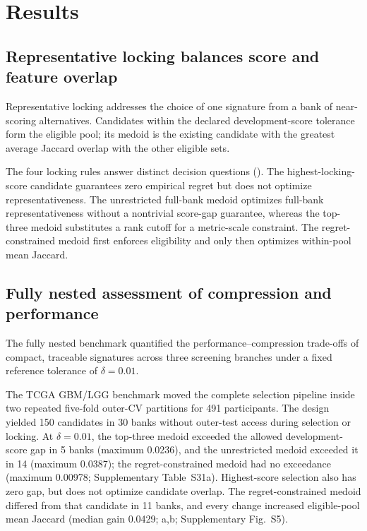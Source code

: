 

\FloatBarrier
\section{Results}

\subsection{Representative locking balances score and feature overlap}

Representative locking addresses the choice of one signature from a bank of near-scoring alternatives. Candidates within the declared development-score tolerance form the eligible pool; its medoid is the existing candidate with the greatest average Jaccard overlap with the other eligible sets.

The four locking rules answer distinct decision questions (). The highest-locking-score candidate guarantees zero empirical regret but does not optimize representativeness. The unrestricted full-bank medoid optimizes full-bank representativeness without a nontrivial score-gap guarantee, whereas the top-three medoid substitutes a rank cutoff for a metric-scale constraint. The regret-constrained medoid first enforces eligibility and only then optimizes within-pool mean Jaccard.


\FloatBarrier

\subsection{Fully nested assessment of compression and performance}

The fully nested benchmark quantified the performance--compression trade-offs of compact, traceable signatures across three screening branches under a fixed reference tolerance of \(\delta=0.01\).

The TCGA GBM/LGG benchmark moved the complete selection pipeline inside two repeated five-fold outer-CV partitions for 491 participants. The design yielded 150 candidates in 30 banks without outer-test access during selection or locking. At \(\delta=0.01\), the top-three medoid exceeded the allowed development-score gap in 5 banks (maximum 0.0236), and the unrestricted medoid exceeded it in 14 (maximum 0.0387); the regret-constrained medoid had no exceedance (maximum 0.00978; Supplementary Table~S31a). Highest-score selection also has zero gap, but does not optimize candidate overlap. The regret-constrained medoid differed from that candidate in 11 banks, and every change increased eligible-pool mean Jaccard (median gain 0.0429; a,b; Supplementary Fig.~S5).

